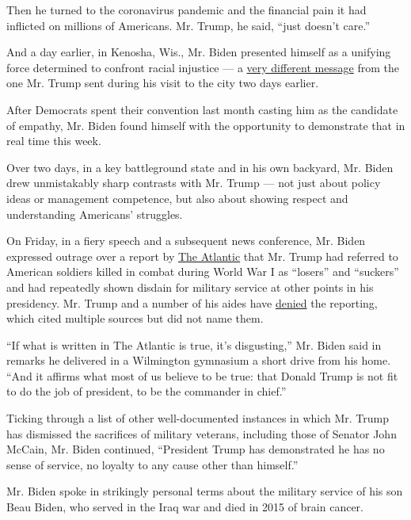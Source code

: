 Then he turned to the coronavirus pandemic and the financial pain it had
inflicted on millions of Americans. Mr. Trump, he said, ``just doesn't
care.''

And a day earlier, in Kenosha, Wis., Mr. Biden presented himself as a
unifying force determined to confront racial injustice --- a
\href{https://www.nytimes3xbfgragh.onion/live/2020/09/04/us/trump-vs-biden/in-kenosha-this-week-the-contrast-between-trump-and-biden-was-strong}{very
different message} from the one Mr. Trump sent during his visit to the
city two days earlier.

After Democrats spent their convention last month casting him as the
candidate of empathy, Mr. Biden found himself with the opportunity to
demonstrate that in real time this week.

Over two days, in a key battleground state and in his own backyard, Mr.
Biden drew unmistakably sharp contrasts with Mr. Trump --- not just
about policy ideas or management competence, but also about showing
respect and understanding Americans' struggles.

On Friday, in a fiery speech and a subsequent news conference, Mr. Biden
expressed outrage over a report by
\href{https://www.theatlantic.com/politics/archive/2020/09/trump-americans-who-died-at-war-are-losers-and-suckers/615997/}{The
Atlantic} that Mr. Trump had referred to American soldiers killed in
combat during World War I as ``losers'' and ``suckers'' and had
repeatedly shown disdain for military service at other points in his
presidency. Mr. Trump and a number of his aides have
\href{https://www.nytimes3xbfgragh.onion/2020/09/04/us/politics/trump-veterans-losers.html?action=click\&module=Top\%20Stories\&pgtype=Homepage}{denied}
the reporting, which cited multiple sources but did not name them.

``If what is written in The Atlantic is true, it's disgusting,'' Mr.
Biden said in remarks he delivered in a Wilmington gymnasium a short
drive from his home. ``And it affirms what most of us believe to be
true: that Donald Trump is not fit to do the job of president, to be the
commander in chief.''

Ticking through a list of other well-documented instances in which Mr.
Trump has dismissed the sacrifices of military veterans, including those
of Senator John McCain, Mr. Biden continued, ``President Trump has
demonstrated he has no sense of service, no loyalty to any cause other
than himself.''

Mr. Biden spoke in strikingly personal terms about the military service
of his son Beau Biden, who served in the Iraq war and died in 2015 of
brain cancer.

